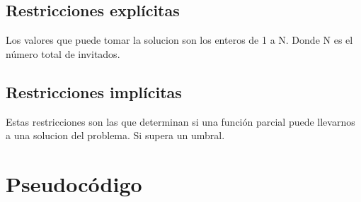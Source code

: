 \subsection{Restricciones explícitas}
Los valores que puede tomar la solucion son los enteros de 1 a N. Donde N es el número total de invitados. 

\subsection{Restricciones implícitas}
Estas restricciones son las que determinan si una función parcial puede llevarnos a una solucion del problema. Si supera un umbral. 


\section{Pseudocódigo}


